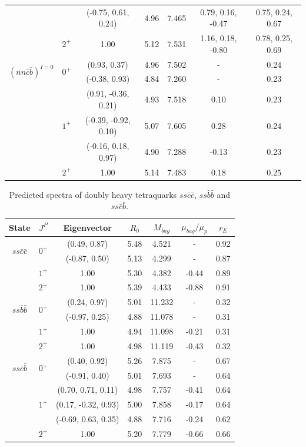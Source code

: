 \documentclass[12pt,onecolumn,floatfix,nofootinbib]{revtex4}
\begin{document}
\begin{table}[!htb]
\begin{tabular}{ccccccc}
&  & (-0.75, 0.61, 0.24) & 4.96 & 7.465 & 0.79, 0.16, -0.47 & 0.75, 0.24, 0.67 \\
& $2^{+}$ & 1.00 & 5.12 & 7.531 & 1.16, 0.18, -0.80 & 0.78, 0.25, 0.69 \\
\multirow{2}{*}{${(nn\bar{c}\bar{b})}^{I=0}$} & \multirow{2}{*}{$0^{+}$} &
(0.93, 0.37) & 4.96 & 7.502 & - & 0.24 \\
&  & (-0.38, 0.93) & 4.84 & 7.260 & - & 0.23 \\
& \multirow{3}{*}{$1^{+}$} & (0.91, -0.36, 0.21) & 4.93 & 7.518 & 0.10 & 0.23 \\
&  & (-0.39, -0.92, 0.10) & 5.07 & 7.605 & 0.28 & 0.24 \\
&  & (-0.16, 0.18, 0.97) & 4.90 & 7.288 & -0.13 & 0.23 \\
& $2^{+}$ & 1.00 & 5.14 & 7.483 & 0.18 & 0.25 \\ \hline\hline
\end{tabular}%
\end{table}

\renewcommand{\tabcolsep}{0.65cm} \renewcommand{\arraystretch}{1.2}
\begin{table}[!htb]
\caption{Predicted spectra of doubly heavy tetraquarks $ss\bar{c}\bar{c}$, $%
ss\bar{b}\bar{b}$ and $ss\bar{c}\bar{b}$. }
\label{tab:2heavytetraquark0}%
\begin{tabular}{ccccccc}
\hline\hline
\textrm{State} & $J^{P}$ & \textrm{Eigenvector} & $R_{0}$ & $M_{bag}$ & $%
\mu_{bag}/\mu_{p}$ & $r_{E}$ \\ \hline
\multirow{2}{*}{$ss\bar{c}\bar{c}$} & \multirow{2}{*}{$0^{+}$} & (0.49, 0.87)
& 5.48 & 4.521 & - & 0.92 \\
&  & (-0.87, 0.50) & 5.13 & 4.299 & - & 0.87 \\
& $1^{+}$ & 1.00 & 5.30 & 4.382 & -0.44 & 0.89 \\
& $2^{+}$ & 1.00 & 5.39 & 4.433 & -0.88 & 0.91 \\
\multirow{2}{*}{$ss\bar{b}\bar{b}$} & \multirow{2}{*}{$0^{+}$} & (0.24, 0.97)
& 5.01 & 11.232 & - & 0.32 \\
&  & (-0.97, 0.25) & 4.88 & 11.078 & - & 0.31 \\
& $1^{+}$ & 1.00 & 4.94 & 11.098 & -0.21 & 0.31 \\
& $2^{+}$ & 1.00 & 4.98 & 11.119 & -0.43 & 0.32 \\
\multirow{2}{*}{$ss\bar{c}\bar{b}$} & \multirow{2}{*}{$0^{+}$} & (0.40, 0.92)
& 5.26 & 7.875 & - & 0.67 \\
&  & (-0.91, 0.40) & 5.01 & 7.693 & - & 0.64 \\
& \multirow{3}{*}{$1^{+}$} & (0.70, 0.71, 0.11) & 4.98 & 7.757
& -0.41 & 0.64 \\
&  & (0.17, -0.32, 0.93) & 5.00 & 7.858 & -0.17 & 0.64 \\
&  & (-0.69, 0.63, 0.35) & 4.88 & 7.716 & -0.24 & 0.62 \\
& $2^{+}$ & 1.00 & 5.20 & 7.779 & -0.66 & 0.66 \\ \hline\hline
\end{tabular}%
\end{table}
\end{document}
